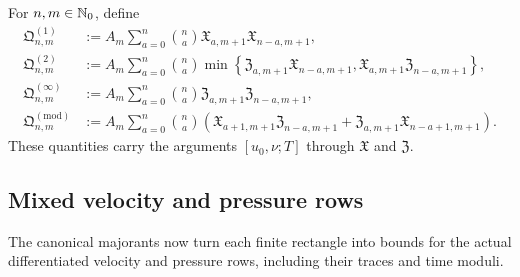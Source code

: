 \begin{definition}
\label{def:qc-closed-pressure-majorants}
For \(n,m\in\mathbb N_0\), define
\begin{align}
 \mathfrak Q^{(1)}_{n,m}
 &:={}
 A_m\sum_{a=0}^{n}\binom na
 \mathfrak X_{a,m+1}\mathfrak X_{n-a,m+1},
 \label{eq:qc-Q1}\\
 \mathfrak Q^{(2)}_{n,m}
 &:={}
 A_m\sum_{a=0}^{n}\binom na
 \min\left\{
 \mathfrak Z_{a,m+1}\mathfrak X_{n-a,m+1},
 \mathfrak X_{a,m+1}\mathfrak Z_{n-a,m+1}
 \right\},
 \label{eq:qc-Q2}\\
 \mathfrak Q^{(\infty)}_{n,m}
 &:={}
 A_m\sum_{a=0}^{n}\binom na
 \mathfrak Z_{a,m+1}\mathfrak Z_{n-a,m+1},
 \label{eq:qc-Qinfty}\\
 \mathfrak Q^{(\mathrm{mod})}_{n,m}
 &:={}
 A_m\sum_{a=0}^{n}\binom na
 \left(
 \mathfrak X_{a+1,m+1}\mathfrak Z_{n-a,m+1}
 +\mathfrak Z_{a,m+1}\mathfrak X_{n-a+1,m+1}
 \right).
 \label{eq:qc-Qmod}
\end{align}
These quantities carry the arguments \([u_0,\nu;T]\) through
\(\mathfrak X\) and \(\mathfrak Z\).
\end{definition}

\subsection{Mixed velocity and pressure rows}

The canonical majorants now turn each finite rectangle into bounds for the
actual differentiated velocity and pressure rows, including their traces and
time moduli.


